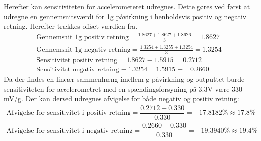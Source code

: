 \noindent Herefter kan sensitiviteten for accelerometeret udregnes. Dette gøres ved først at udregne en gennemsnitsværdi for 1g påvirkning i henholdsvis positiv og negativ retning. Herefter trækkes offset værdien fra.
\begin{align}
	\text{Gennemsnit 1g positiv retning} = \frac{1.8627 + 1.8627 + 1.8626}{3} = 1.8627 \\
	\text{Gennemsnit 1g negativ retning} = \frac{1.3254 + 1.3255 + 1.3254}{3} = 1.3254 \\
	\text{Sensitivitet positiv retning} = 1.8627 - 1.5915 = 0.2712 \\
	\text{Sensitivitet negativ retning} = 1.3254 - 1.5915 = -0.2660
\end{align}
\noindent Da der findes en lineær sammenhæng imellem g påvirkning og outputtet burde sensitiviteten for accelerometret med en spændingsforsyning på 3.3V være 330 mV/g. Der kan derved udregnes afvigelse for både negativ og positiv retning:
\begin{align}
	\text{Afvigelse for sensitivitet i positiv retning} = \dfrac{0.2712 - 0.330}{0.330} = -17.8182\% \approx 17.8\% \\
	\text{Afvigelse for sensitivitet i negativ retning} = \dfrac{0.2660 - 0.330}{0.330} = -19.3940\% \approx 19.4\%
\end{align}

